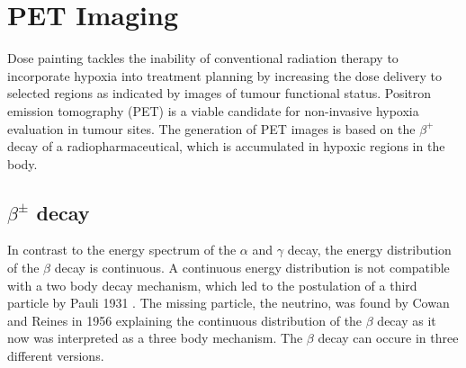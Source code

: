 \section{PET Imaging}
Dose painting tackles the inability of conventional radiation therapy to incorporate hypoxia into treatment planning by increasing the dose delivery to selected regions as indicated by images of tumour functional status. Positron emission tomography (PET) is a viable candidate for non-invasive hypoxia evaluation in tumour sites. The generation of PET images is based on the $\beta^+$ decay of a radiopharmaceutical, which is accumulated in hypoxic regions in the body. 
\subsection{$\beta^\pm$ decay}
In contrast to the energy spectrum of the $\alpha$ and $\gamma$ decay, the energy distribution of the $\beta$ decay is continuous. A continuous energy distribution is not compatible with a two body decay mechanism, which led to the postulation of a third particle by Pauli 1931 \cite{?}. The missing particle, the neutrino, was found by Cowan and Reines in 1956 \cite{?} explaining the continuous distribution of the $\beta$ decay as it now was interpreted as a three body mechanism. The $\beta$ decay can occure in three different versions.
